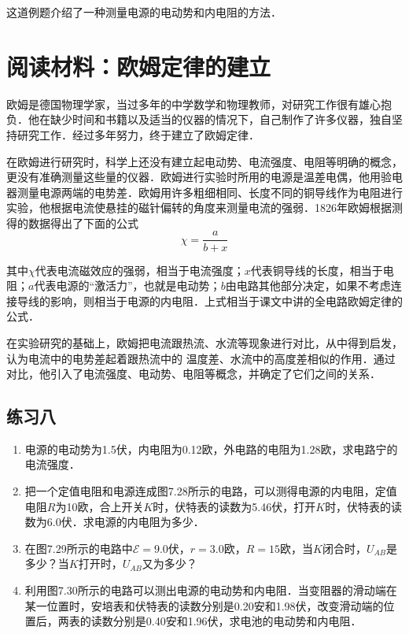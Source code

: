 这道例题介绍了一种测量电源的电动势和内电阻的方法．


\section*{阅读材料：欧姆定律的建立}

欧姆是德国物理学家，当过多年的中学数学和物理教师，对研究工作很有雄心抱负．他在缺少时间和书籍以及适当的仪器的情况下，自己制作了许多仪器，独自坚持研究工作．经过多年努力，终于建立了欧姆定律．

在欧姆进行研究时，科学上还没有建立起电动势、电流强度、电阻等明确的概念，更没有准确测量这些量的仪器．欧姆进行实验时所用的电源是温差电偶，他用验电器测量电源两端的电势差．欧姆用许多粗细相同、长度不同的铜导线作为电阻进行实验，他根据电流使悬挂的磁针偏转的角度来测量电流的强弱．1826年欧姆根据测得的数据得出了下面的公式
\[\chi=\frac{a}{b+x}\]

其中$\chi$代表电流磁效应的强弱，相当于电流强度；$x$代表铜导线的长度，相当于电阻；$a$代表电源的“激活力”，也就是电动势；$b$由电路其他部分决定，如果不考虑连接导线的影响，则相当于电源的内电阻．上式相当于课文中讲的全电路欧姆定律的公式．

在实验研究的基础上，欧姆把电流跟热流、水流等现象进行对比，从中得到启发，认为电流中的电势差起着跟热流中的
温度差、水流中的高度差相似的作用．通过对比，他引入了电流强度、电动势、电阻等概念，并确定了它们之间的关系．


\subsection*{练习八}
\begin{enumerate}
    \item 电源的电动势为1.5伏，内电阻为0.12欧，外电路的电阻为1.28欧，求电路宁的电流强度．
    \item 把一个定值电阻和电源连成图7.28所示的电路，可以测得电源的内电阻，定值电阻$R$为10欧，合上开关$K$时，伏特表的读数为5.46伏，打开$K$时，伏特表的读数为6.0伏．求电源的内电阻为多少．
    \item 在图7.29所示的电路中$\mathcal{E}=9.0$伏，$r=3.0$欧，$R=15$欧，当$K$闭合时，$U_{AB}$是多少？当$K$打开时，$U_{AB}$又为多少？
    \item 利用图7.30所示的电路可以测出电源的电动势和内电阻．当变阻器的滑动端在某一位置时，安培表和伏特表的读数分别是0.20安和1.98伏，改变滑动端的位置后，两表的读数分别是0.40安和1.96伏，求电池的电动势和内电阻．

\end{enumerate}

